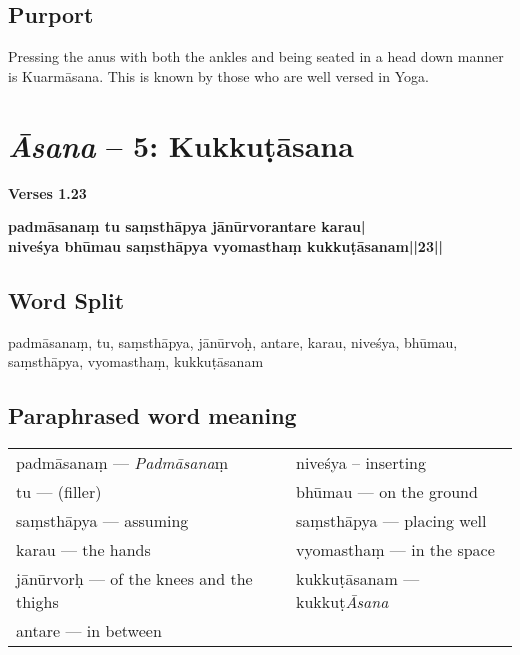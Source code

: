 \subsection*{Purport}

Pressing the anus with both the ankles and being seated in a head down manner is Kuarmāsana. This is known by those who are well versed in Yoga. 

\newpage


\section*{\textit{Āsana} -- 5: Kukkuṭāsana}

\noindent 
\textbf{Verses 1.23}

\begin{shloka}
\textbf{padmāsanaṃ tu saṃsthāpya jānūrvorantare karau|}\\
\textbf{niveśya bhūmau saṃsthāpya vyomasthaṃ kukkuṭāsanam||23||}
\end{shloka}

\subsection*{Word Split}

padmāsanaṃ, tu, saṃsthāpya, jānūrvoḥ, antare, karau, niveśya, bhūmau, saṃsthāpya, vyomasthaṃ, kukkuṭāsanam

\subsection*{Paraphrased word meaning}
\vspace{-10pt}

\begin{longtable}{>{\noindent\raggedright}p{5cm}>{\noindent\raggedright}p{5cm}}
padmāsanaṃ --- \textit{Padmāsana}ṃ & niveśya – inserting\tabularnewline
tu  --- (filler) & bhūmau --- on the ground\tabularnewline
saṃsthāpya --- assuming  & saṃsthāpya --- placing well\tabularnewline
karau --- the hands  & vyomasthaṃ --- in the space\tabularnewline
jānūrvorḥ --- of the knees and the thighs  & kukkuṭāsanam --- kukkuṭ\textit{Āsana} \tabularnewline
antare --- in between & 
\end{longtable}
\vspace{-10pt}

